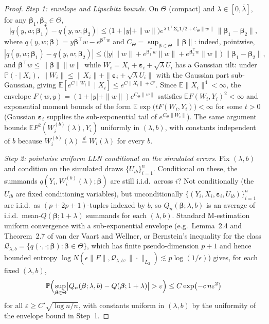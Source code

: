 \documentclass[11pt]{article}
\theoremstyle{plain}
\theoremstyle{definition}
\newcommand{\E}{\mathbb{E}}
\newcommand{\Prob}{\mathbb{P}}
\newcommand{\bet}{\bm{\beta}}
\newcommand{\beps}{\bm{\varepsilon}}
\newcommand{\bSig}{\bm{\Sigma}}
\begin{document}
\begin{proof}
\emph{Step 1: envelope and Lipschitz bounds.} On $\Theta$ (compact) and
$\lambda\in[0,\bar\lambda]$, for any $\bet_1,\bet_2\in\Theta$,
\[
  \bigl|q(y,w;\bet_1)-q(y,w;\bet_2)\bigr|
  \le \bigl(1+|y|+\|w\|\bigr)e^{\bar\lambda\,\bm 1^\top\bSig_\epsilon\bm 1/2
        + C_{\Theta}\|w\|}\,\|\bet_1-\bet_2\|,
\]
where $q(y,w;\bet)=y\bet^\top w-e^{\bet^\top w}$ and $C_\Theta=
\sup_{\bet\in\Theta}\|\bet\|$: indeed, pointwise,
\[
  |q(y,w;\bet_1)-q(y,w;\bet_2)|\le \bigl(|y|\|w\|
  + e^{\bet_1^\top w}\|w\| + e^{\bet_2^\top w}\|w\|\bigr)\,
  \|\bet_1-\bet_2\|,
\]
and
$\bet^\top w\le\|\bet\|\|w\|$ while
$W_i=X_i+\beps_i+\sqrt\lambda U_i$ has a Gaussian tilt: under
$\Prob(\cdot\mid X_i)$, $\|W_i\|\le\|X_i\|+\|\beps_i+\sqrt\lambda U_i\|$
with the Gaussian part sub-Gaussian, giving
$\E[e^{C\|W_i\|}\mid X_i]\le e^{C\|X_i\|+C'}$. Since $\E\|X_i\|^4<\infty$,
the envelope $F(w,y)=(1+|y|+\|w\|)e^{C_{\Theta}\|w\|}$ satisfies
$\E F(W_i,Y_i)^2<\infty$ and exponential moment bounds of the
form
$\E\exp\bigl(tF(W_i,Y_i)\bigr)<\infty$ for some $t>0$ (Gaussian
$\beps_i$ supplies the sub-exponential tail of $e^{C_\Theta\|W_i\|}$).
The same argument bounds $\E F^2(W_i^{(b)}(\lambda),Y_i)$ uniformly in
$(\lambda,b)$, with constants independent of $b$ because
$W_i^{(b)}(\lambda)\stackrel{d}{=}W_i(\lambda)$ for every $b$.

\emph{Step 2: pointwise uniform LLN conditional on the simulated errors.}
Fix $(\lambda,b)$ and condition on the simulated draws
$\{U_{ib}\}_{i=1}^n$. Conditional on these, the summands
$q(Y_i,W_i^{(b)}(\lambda);\bet)$ are still i.i.d.\ across $i$? Not
conditionally (the $U_{ib}$ are fixed conditioning variables), but
unconditionally
$\{(Y_i,X_i,\beps_i,U_{ib})\}_{i=1}^n$ are i.i.d.\ as $(p+2p+1)$-tuples
indexed by $b$, so $Q_n(\bet;\lambda,b)$ is an average of i.i.d.\
mean-$Q(\bet;1+\lambda)$ summands for each $(\lambda,b)$. Standard
M-estimation uniform convergence with a sub-exponential envelope
(e.g.\ Lemma~2.4 and Theorem~2.7 of van der Vaart and Wellner, or
Bernstein's inequality for the class
$\mathcal Q_{\lambda,b}=\{q(\cdot,\cdot;\bet):\bet\in\Theta\}$, which has
finite pseudo-dimension $p+1$ and hence bounded entropy
$\log N(\epsilon\|F\|,\mathcal Q_{\lambda,b},\|\cdot\|_{L_2})
\lesssim p\log(1/\epsilon)$) gives, for each fixed $(\lambda,b)$,
\[
  \Prob\Bigl(\sup_{\bet\in\Theta}
  \bigl|Q_n(\bet;\lambda,b)-Q(\bet;1+\lambda)\bigr|>\varepsilon\Bigr)
  \le C\exp\bigl(-c\,n\varepsilon^2\bigr)
\]
for all $\varepsilon\ge C'\sqrt{\log n/n}$, with constants uniform in
$(\lambda,b)$ by the uniformity of the envelope bound in Step~1.


\end{proof}
\end{document}
